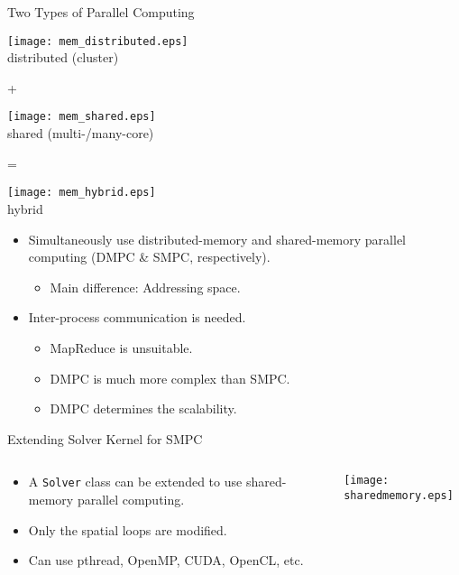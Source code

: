 \documentclass[dvips,xcolor=pst,14pt]{beamer}
\begin{document}
\begin{frame}{
%
Two Types of Parallel Computing
%
}
\begin{minipage}[c]{\textwidth}\centering \footnotesize
\parbox{0.3\textwidth}{\centering
\texttt{[image: mem\_distributed.eps]} \\ \footnotesize
distributed (cluster)}
+ 
\parbox{0.3\textwidth}{\centering 
\texttt{[image: mem\_shared.eps]} \\ \scriptsize shared
(multi-/many-core)}
= 
\parbox{0.3\textwidth}{\centering
\texttt{[image: mem\_hybrid.eps]} \\ \footnotesize hybrid}
\end{minipage}
\begin{itemize}
  \item Simultaneously use distributed-memory and shared-memory parallel
  computing (DMPC \& SMPC, respectively).
  \begin{itemize}
    \item Main difference: \alert{Addressing space}.
  \end{itemize}
  \item Inter-process communication is needed.
  \begin{itemize}
    \item \alert{MapReduce is unsuitable}.
    \item DMPC is much more complex than SMPC.
    \item \alert{DMPC determines the scalability}.
  \end{itemize}
\end{itemize}
\end{frame}

\begin{frame}{
%
Extending Solver Kernel for SMPC
%
}
\begin{columns}[c]
\begin{column}{.75\textwidth}
\begin{itemize}
  \item A \texttt{Solver} class can be extended to use shared-memory parallel
  computing.
  \item Only the spatial loops are modified.
  \item Can use pthread, OpenMP, CUDA, OpenCL, etc.
\end{itemize}
\end{column}
\begin{column}{.25\textwidth} \centering
  \texttt{[image: sharedmemory.eps]}
\end{column}
\end{columns}
\end{frame}
\end{document}
